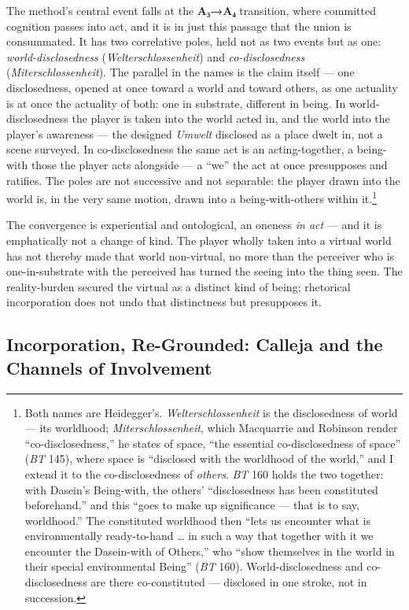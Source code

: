 \documentclass{article}
\begin{document}
The method's central event falls at the \textbf{A₃→A₄} transition, where committed cognition passes into act, and it is in just this passage that the union is consummated. It has two correlative poles, held not as two events but as one: \textit{world-disclosedness} (\textit{Welterschlossenheit}) and \textit{co-disclosedness} (\textit{Miterschlossenheit}). The parallel in the names is the claim itself — one disclosedness, opened at once toward a world and toward others, as one actuality is at once the actuality of both: one in substrate, different in being. In world-disclosedness the player is taken into the world acted in, and the world into the player's awareness — the designed \textit{Umwelt} disclosed as a place dwelt in, not a scene surveyed. In co-disclosedness the same act is an acting-together, a being-with those the player acts alongside — a ``we'' the act at once presupposes and ratifies. The poles are not successive and not separable: the player drawn into the world is, in the very same motion, drawn into a being-with-others within it.\footnote{Both names are Heidegger's. \textit{Welterschlossenheit} is the disclosedness of world — its worldhood; \textit{Miterschlossenheit}, which Macquarrie and Robinson render ``co-disclosedness,'' he states of space, ``the essential co-disclosedness of space'' (\textit{BT} 145), where space is ``disclosed with the worldhood of the world,'' and I extend it to the co-disclosedness of \textit{others}. \textit{BT} 160 holds the two together: with Dasein's Being-with, the others' ``disclosedness has been constituted beforehand,'' and this ``goes to make up significance — that is to say, worldhood.'' The constituted worldhood then ``lets us encounter what is environmentally ready-to-hand … in such a way that together with it we encounter the Dasein-with of Others,'' who ``show themselves in the world in their special environmental Being'' (\textit{BT} 160). World-disclosedness and co-disclosedness are there co-constituted — disclosed in one stroke, not in succession.}

The convergence is experiential and ontological, an oneness \textit{in act} — and it is emphatically not a change of kind. The player wholly taken into a virtual world has not thereby made that world non-virtual, no more than the perceiver who is one-in-substrate with the perceived has turned the seeing into the thing seen. The reality-burden secured the virtual as a distinct kind of being; rhetorical incorporation does not undo that distinctness but presupposes it.

\subsection*{Incorporation, Re-Grounded: Calleja and the Channels of Involvement}
\end{document}

